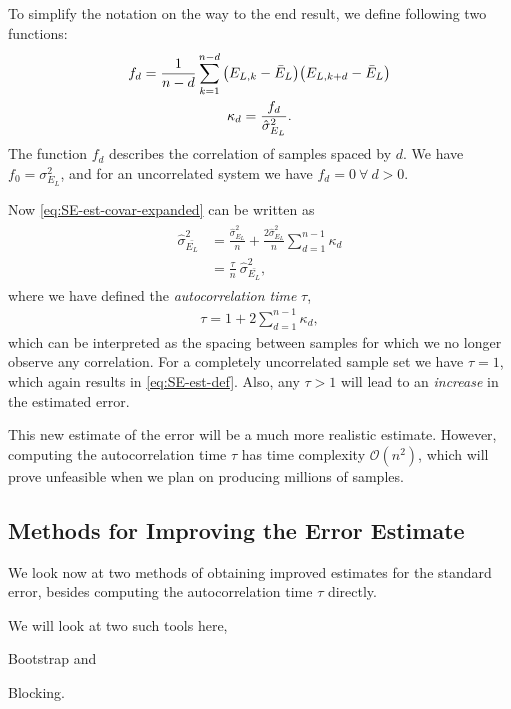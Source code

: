 \documentclass[twocolumn]{article}
\begin{document}
To simplify the notation on the way to the end result, we define following two 
functions:
\begin{gather}
    f_d = \frac{1}{n-d}\sum_{k=1}^{n-d} \qty(E_{L,k} -
    \bar{E}_L)\qty(E_{L,k+d}-\bar{E}_L)\\
    \kappa_d = \frac{f_d}{\hat{\sigma}^2_{E_L}}.
\end{gather}
The function $f_d$ describes the correlation of samples spaced by $d$. We have
$f_0=\sigma_{E_L}^2$, and for an uncorrelated system we have $f_d=0\
\forall\ d>0$.

Now \eqref{eq:SE-est-covar-expanded} can be written as
\begin{align}
    \begin{split}
    \hat{\sigma}^2_{\bar{E_L}} &= \frac{\hat{\sigma}^2_{E_L}}{n} +
    \frac{2\hat{\sigma}^2_{E_L}}{n}\sum_{d=1}^{n-1}\kappa_d\\
    &= \frac{\tau}{n}\ \hat{\sigma}^2_{\bar{E_L}},
    \end{split}
\end{align}
where we have defined the \textit{autocorrelation time} $\tau$, 
\begin{align}
    \tau = 1 + 2\sum_{d=1}^{n-1}\kappa_d,\label{eq:autocorr-time-def}
\end{align}
which can be interpreted as the spacing between samples for which we no longer
observe any correlation. For a completely uncorrelated sample set we have $\tau
=1$, which again results in \eqref{eq:SE-est-def}. Also, any $\tau>1$ will lead
to an \textit{increase} in the estimated error.

This new estimate of the error will be a much more realistic estimate. However,
computing the autocorrelation time $\tau$ has time complexity $\mathcal{O}(n^2)$, which will prove
unfeasible when we plan on producing millions of samples.

\subsection{Methods for Improving the Error Estimate}

We look now at two methods of obtaining improved estimates for the standard
error, besides computing the autocorrelation time $\tau$ directly.

We will look at two such tools here, 
\begin{inparaenum}[1)]
    \item Bootstrap and
    \item Blocking.
\end{inparaenum}
\end{document}
